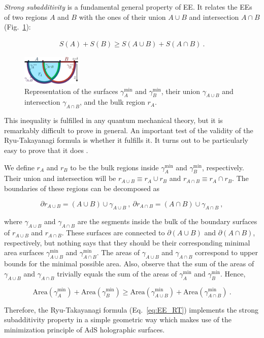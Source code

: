 \documentclass[twocolumn]{revtex4}
\providecommand{\eq}[2]{
    \begin{equation}
        #2
    \label{eq:#1}
    \end{equation}
}
\providecommand{\eqgat}[2]{
    \begin{gather}
        #2
    \label{eq:#1}
    \end{gather}
}
\begin{document}
\emph{Strong subadditivity}  is a fundamental general property of EE. It relates the EEs of two regions $A$ and $B$ with the ones of their union $A \cup B$ and intersection $A \cap B$ %
(Fig.~\ref{fig:SS}):
\eqgat{EE_strong-subadd}{
    S(A) + S(B) \ge S(A \cup B) + S(A \cap B) \ . %
}
\begin{figure}
    \centering
    \includegraphics[width=0.25\textwidth]{../imatges/SS_2-D.png}
\caption{Representation of the surfaces $\gamma_A^\text{min}$ and $\gamma_B^\text{min}$, their union $\gamma_{A \cup B}$ and intersection $\gamma_{A \cap B}$, and the bulk region $r_A$.}
\label{fig:SS}
\end{figure}
This inequality is fulfilled in any quantum mechanical theory, but it is remarkably difficult to prove in general. An important test of the validity of the Ryu-Takayanagi formula is whether it fulfills it. It turns out to be particularly easy to prove that it does \cite{headrick_holographic_2007}.

We define $r_A$ and $r_B$ to be the bulk regions inside $\gamma^{\text{min}}_A$ and $\gamma^{\text{min}}_B$, respectively. Their union and intersection will be $r_{A \cup B} \equiv  r_A \cup r_B$ and $r_{A \cap B} \equiv  r_A \cap r_B$. The boundaries of these regions can be decomposed as
\eq{SS_dr-1}{
    \partial r_{A \cup B} = (A \cup B) \cup \gamma_{A \cup B} \ , \ \partial r_{A \cap B } = (A \cap B) \cup \gamma_{A \cap B} \ , \nonumber
}
where $\gamma_{A \cup B}$ and $\gamma_{A \cap B}$ are the segments inside the bulk of the boundary surfaces of $r_{A \cup B}$ and $r_{A \cap B}$. These surfaces are connected to $\partial (A \cup B)$ and $\partial (A \cap B)$, respectively, but nothing says that they should be their corresponding minimal area surfaces $\gamma^{\text{min}}_{A \cup B}$ and $\gamma^{\text{min}}_{A \cap B}$. The areas of $\gamma_{A \cup B}$ and $\gamma_{A \cap B}$ correspond to upper bounds for the minimal possible area. Also, observe that the sum of the areas of $\gamma_{A \cup B}$ and $\gamma_{A \cap B}$ trivially equals the sum of the areas of $\gamma^{\text{min}}_A$ and $\gamma^{\text{min}}_B$. Hence,
\eq{SS_gamma-1}{
    {\text{Area}}(\gamma^{\text{min}}_A) + {\text{Area}}(\gamma^{\text{min}}_B) %
    \ge   {\text{Area}}(\gamma^{\text{min}}_{A \cup B}) +   {\text{Area}}(\gamma^{\text{min}}_{A \cap B}) \ . \nonumber
}
Therefore, the Ryu-Takayanagi formula (Eq.~\ref{eq:EE_RT}) implements the strong subadditivity property in a simple geometric way which makes use of the minimization principle of AdS holographic surfaces. %
\end{document}
